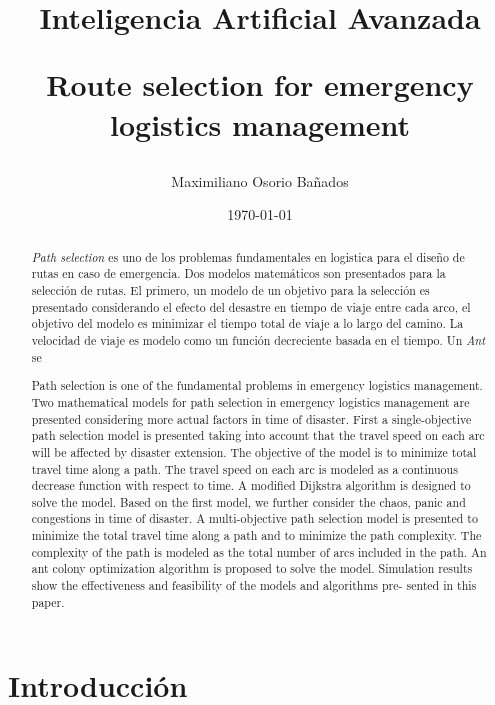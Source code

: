 \documentclass[letter, 10pt]{article}
\begin{document}
\title{Inteligencia Artificial Avanzada \\ \begin{Large} Route selection for emergency logistics management\end{Large}}
\author{Maximiliano Osorio Bañados}
\date{\today}
\maketitle


\begin{abstract}
\textit{Path selection} es uno de los problemas fundamentales en logistica para el diseño de rutas en caso de emergencia. Dos modelos matemáticos son presentados para la selección de rutas. El primero, un modelo de un objetivo para la selección es presentado considerando el efecto del desastre en tiempo de viaje entre cada arco, el objetivo del modelo es minimizar el tiempo total de viaje a lo largo del camino. La velocidad de viaje es modelo como un función decreciente basada en el tiempo. Un  \textit{Ant } se 


Path selection is one of the fundamental problems in emergency logistics management. Two mathematical models for path selection in emergency logistics management are presented considering more actual factors in time of disaster. First a single-objective path selection model is presented taking into account that the travel speed on each arc will be affected by disaster extension. The objective of the model is to minimize total travel time along a path. The travel speed on each arc is modeled as a continuous decrease function with respect to time. A modified Dijkstra algorithm is designed to solve the model. Based on the first model, we further consider the chaos, panic and congestions in time of disaster. A multi-objective path selection model is presented to minimize the total travel time along a path and to minimize the path complexity. The complexity of the path is modeled as the total number of arcs included in the path. An ant colony optimization algorithm is proposed to solve the model. Simulation results show the effectiveness and feasibility of the models and algorithms pre- sented in this paper.
\end{abstract}

\section{Introducci\'on}
\end{document}
